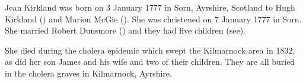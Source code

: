 
Jean Kirkland was born on 3 January 1777 in	Sorn, Ayrshire, Scotland \cite{JKirklandBirth} to Hugh Kirkland () and Marion McGie (). She was christened on 7 January 1777 in Sorn.
She married Robert Dunsmore () and they had five children (see). 

She died during the cholera epidemic which swept the Kilmarnock area in 1832, as did her son James and his wife and two of their children.\cite{DRDunsmoreDeath} They are all buried in the cholera graves in Kilmarnock, Ayrshire.


